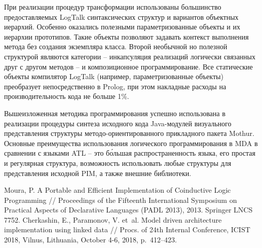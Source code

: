 \documentclass[12pt]{llncs}
\begin{document}
При реализации процедур трансформации использованы большинство предоставляемых LogTalk синтаксических структур и вариантов объектных иерархий.  Особенно оказались полезными параметризованные объекты и их иерархии прототипов.  Такие объекты позволяют задавать контекст выполнения метода без создания экземпляра класса.  Второй необычной но полезной структурой являются категории -- инкапсуляция реализаций логически связанных друг с другом методов -- и композиционное программирование. Все статические объекты компилятор LogTalk (например, параметризованные объекты) преобразует непосредственно в Prolog, при этом накладные расходы на производительность кода не больше 1\%.

Вышеизложенная методика программирования успешно использована в реализации процедуры синтеза исходного кода Java-модулей визуального представления структуры методо-ориентированного прикладного пакета Mothur. Основные преимущества использования логического программирования в MDA в сравнении с языками ATL -- это б\'ольшая распространенность языка, его простая и регулярная структура, возможность использовать любые структуры для представления исходной PIM, а также внешние библиотеки.


\begin{thebibliography}{9}
 Moura, P. A Portable and Efficient Implementation of Coinductive Logic Programming // Proceedings of the Fifteenth International Symposium on Practical Aspects of Declarative Languages (PADL 2013), 2013. Springer LNCS 7752.
 Cherkashin, E., Paramonov, V. et~al. Model driven architecture implementation using linked data // Procs. of 24th Internal Conference, ICIST 2018, Vilnus, Lithuania, October 4-6, 2018, p.~412--423.
\end{thebibliography}
\end{document}
